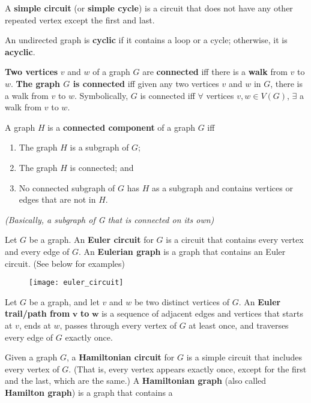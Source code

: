 \documentclass{article}
\begin{document}
\begin{description}
    \item \qquad A \textbf{simple circuit} (or \textbf{simple cycle}) is a circuit that does not have any other repeated vertex except the first and last.
    \item \qquad An undirected graph is \textbf{cyclic} if it contains a loop or a cycle; otherwise, it is \textbf{acyclic}.
    \item[Connectedness]\textbf{Two vertices} $v$ and $w$ of a graph $G$ are \textbf{connected} iff there is a \textbf{walk} from $v$ to $w$. \textbf{The graph $G$ is connected} iff given any two vertices $v$ and $w$ in $G$, there is a walk from $v$ to $w$. Symbolically, $G$ is connected iff $\forall$ vertices $v,w\in V(G)$, $\exists$ a walk from $v$ to $w$.
    \item[Connected Component] A graph $H$ is a \textbf{connected component} of a graph $G$ iff 
    \begin{enumerate}
    	\item The graph $H$ is a subgraph of $G$;
		\item The graph $H$ is connected; and
		\item No connected subgraph of $G$ has $H$ as a subgraph and contains vertices or edges that are not in $H$.
    \end{enumerate}
    \item \qquad \emph{(Basically, a subgraph of G that is connected on its own)}
    \item[Euler Circuit and Eulerian Graph] Let $G$ be a graph. An \textbf{Euler circuit} for $G$ is a circuit that contains every vertex and every edge of $G$. An \textbf{Eulerian graph} is a graph that contains an Euler circuit. (See below for examples)
    \begin{figure}[H]
    	\centering
		\texttt{[image: euler\_circuit]}
    \end{figure}
    \item[Euler Trail] Let $G$ be a graph, and let $v$ and $w$ be two distinct vertices of $G$. An \textbf{Euler trail/path from} $\mathbf{v}$ \textbf{to} $\mathbf{w}$ is a sequence of adjacent edges and vertices that starts at $v$, ends at $w$, passes through every vertex of $G$ at least once, and traverses every edge of $G$ exactly once.
    \item[Hamiltonian Circuit and Hamiltonian Graph] Given a graph $G$, a \textbf{Hamiltonian circuit} for $G$ is a simple circuit that includes every vertex of $G$. (That is, every vertex appears exactly once, except for the first and the last, which are the same.) A \textbf{Hamiltonian graph} (also called \textbf{Hamilton graph}) is a graph that contains a

\end{description}
\end{document}
